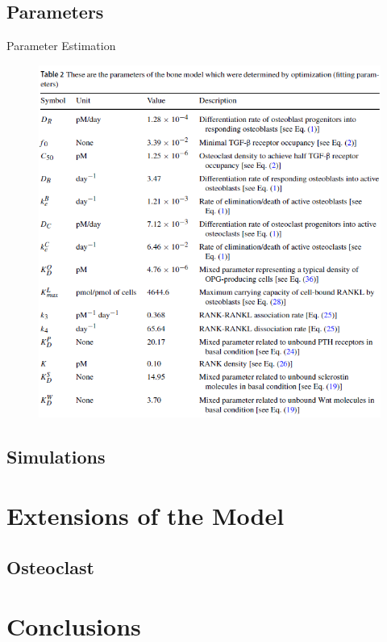 \documentclass{beamer}
\begin{document}
\subsection{Parameters}
\begin{frame}{Parameter Estimation}
\begin{figure}[h]
	\centering
		\includegraphics[scale=0.45]{../Figures/fig_lemaire_table2.png}
\end{figure}	
\end{frame}
\subsection{Simulations}

\section{Extensions of the Model}

\subsection{Osteoclast}

\section{Conclusions}
\end{document}
